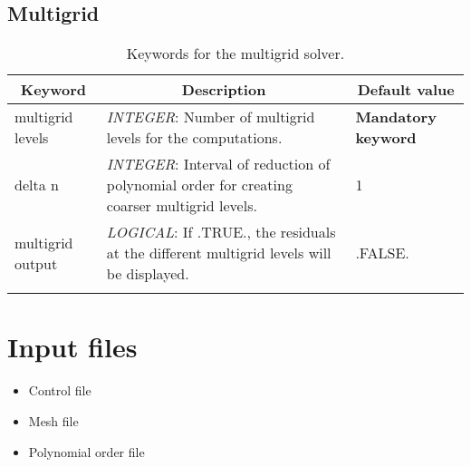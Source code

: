 \documentclass[a4paper,10pt]{report}
\begin{document}
\section{Multigrid}
\begin{table}[htbp]
\caption{Keywords for the multigrid solver.}
\begin{tabular}{|l|p{10cm}|p{2.2cm}|}
\hline
\multicolumn{1}{|c|}{Keyword} & \multicolumn{1}{c|}{Description} & \multicolumn{1}{c|}{Default value} \\ \hline

multigrid levels & \textit{INTEGER}: Number of multigrid levels for the computations. & \textbf{Mandatory keyword} \\ \hline

delta n          & \textit{INTEGER}: Interval of reduction of polynomial order for creating coarser multigrid levels.& 1 \\ \hline

multigrid output & \textit{LOGICAL}: If .TRUE., the residuals at the different multigrid levels will be displayed. & .FALSE. \\ \hline
   
    &  &  \\ \hline
\end{tabular}
\label{tab:multigridKey}
\end{table}

\chapter{Input files}
\begin{itemize}
\item Control file
\item Mesh file
\item Polynomial order file
\end{itemize}


\end{document}
